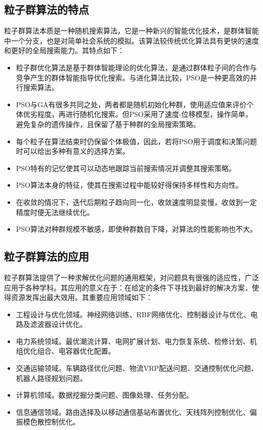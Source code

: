 \subsection{粒子群算法的特点}
粒子群算法本质是一种随机搜索算法，它是一种新兴的智能优化技术，是群体智能中一个分支，也是对简单社会系统的模拟。该算法较传统优化算法具有更快的速度和更好的全局搜索能力。其特点如下：
\begin{itemize}
	\item 粒子群优化算法是基于群体智能理论的优化算法，是通过群体粒子间的合作与竞争产生的群体智能指导优化搜索。与进化算法比较，PSO是一种更高效的并行搜索算法。
	
	\item PSO与GA有很多共同之处，两者都是随机初始化种群，使用适应值来评价个体优劣程度，再进行随机化搜索。但PSO采用了速度-位移模型，操作简单，避免复杂的遗传操作，且保留了基于种群的全局搜索策略。
	
	\item 每个粒子在算法结束时仍保留个体极值，因此，若将PSO用于调度和决策问题时可以给出多种有意义的选择方案。
	
	\item PSO特有的记忆使其可以动态地跟踪当前搜索情况并调整其搜索策略。
	
	\item PSO算法本身的特征，使其在搜索过程中能较好得保持多样性和方向性。
	
	\item 在收敛的情况下，迭代后期粒子趋向同一化，收敛速度明显变慢，收敛到一定精度时便无法继续优化。
	
	\item PSO算法对种群规模不敏感，即使种群数目下降，对算法的性能影响也不大。
\end{itemize}
	

\subsection{粒子群算法的应用}
粒子群算法提供了一种求解优化问题的通用框架，对问题具有很强的适应性，广泛应用于各种学科。其应用的意义在于：在给定的条件下寻找到最好的解决方案，使得资源发挥出最大效用。其重要应用领域如下：
\begin{itemize}
	\item 工程设计与优化领域。神经网络训练、RBF网络优化、控制器设计与优化、电路及滤波器设计优化。
	\item 电力系统领域。最优潮流计算、电网扩展计划、电力恢复系统、检修计划、机组优化组合、电容器优化配置。
	\item 交通运输领域。车辆路径优化问题、物流VRP配送问题、交通控制优化问题、机器人路径规划问题。
	\item 计算机领域。数据挖掘分类问题、图像处理、任务分配。
	\item 信息通信领域。路由选择及以移动通信基站布置优化、天线阵列控制优化、偏振模色散控制优化。
\end{itemize}
 

